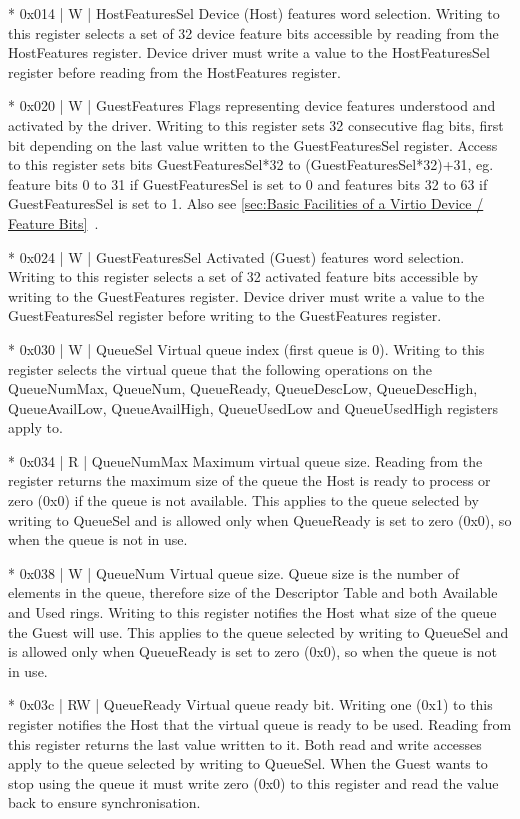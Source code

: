 * 0x014 | W | HostFeaturesSel
  Device (Host) features word selection.
  Writing to this register selects a set of 32 device feature bits
  accessible by reading from the HostFeatures register. Device driver
  must write a value to the HostFeaturesSel register before
  reading from the HostFeatures register.

* 0x020 | W | GuestFeatures
  Flags representing device features understood and activated by
  the driver.
  Writing to this register sets 32 consecutive flag bits, first
  bit depending on the last value written to the GuestFeaturesSel
  register. Access to this register sets bits GuestFeaturesSel*32
  to (GuestFeaturesSel*32)+31, eg. feature bits 0 to 31 if
  GuestFeaturesSel is set to 0 and features bits 32 to 63 if
  GuestFeaturesSel is set to 1. Also see \ref{sec:Basic Facilities of a Virtio Device / Feature Bits}~.

* 0x024 | W | GuestFeaturesSel
  Activated (Guest) features word selection.
  Writing to this register selects a set of 32 activated feature
  bits accessible by writing to the GuestFeatures register.
  Device driver must write a value to the GuestFeaturesSel
  register before writing to the GuestFeatures register.

* 0x030 | W | QueueSel
  Virtual queue index (first queue is 0).
  Writing to this register selects the virtual queue that the
  following operations on the QueueNumMax, QueueNum, QueueReady,
  QueueDescLow, QueueDescHigh, QueueAvailLow, QueueAvailHigh,
  QueueUsedLow and QueueUsedHigh registers apply to.

* 0x034 | R | QueueNumMax
  Maximum virtual queue size.
  Reading from the register returns the maximum size of the queue
  the Host is ready to process or zero (0x0) if the queue is not
  available. This applies to the queue selected by writing to
  QueueSel and is allowed only when QueueReady is set to zero
  (0x0), so when the queue is not in use.

* 0x038 | W | QueueNum
  Virtual queue size.
  Queue size is the number of elements in the queue, therefore size
  of the Descriptor Table and both Available and Used rings.
  Writing to this register notifies the Host what size of the
  queue the Guest will use. This applies to the queue selected by
  writing to QueueSel and is allowed only when QueueReady is set
  to zero (0x0), so when the queue is not in use.

* 0x03c | RW | QueueReady
  Virtual queue ready bit.
  Writing one (0x1) to this register notifies the Host that the
  virtual queue is ready to be used. Reading from this register
  returns the last value written to it. Both read and write
  accesses apply to the queue selected by writing to QueueSel.
  When the Guest wants to stop using the queue it must write
  zero (0x0) to this register and read the value back to
  ensure synchronisation.


